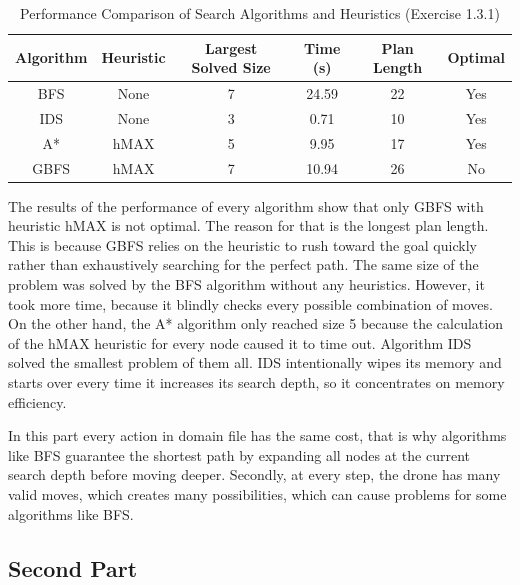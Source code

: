 \documentclass{article}
\begin{document}
\begin{table}[H]
\centering
\begin{tabular}{|c|c|c|c|c|c|}
\hline
\textbf{Algorithm} & \textbf{Heuristic} & \textbf{Largest Solved Size} & \textbf{Time (s)} & \textbf{Plan Length} & \textbf{Optimal} \\ \hline
BFS & None & 7 & 24.59 & 22 & Yes \\ \hline
IDS & None & 3 & 0.71 & 10 & Yes \\ \hline
A* & hMAX & 5 & 9.95 & 17 & Yes \\ \hline
GBFS & hMAX & 7 & 10.94 & 26 & No \\ \hline
\end{tabular}
\caption{Performance Comparison of Search Algorithms and Heuristics (Exercise 1.3.1)}
\label{tab:results_1_3_1}
\end{table}
The results of the performance of every algorithm show that only GBFS with heuristic hMAX is not optimal. The reason for that is the longest plan length. This is because GBFS relies on the heuristic to rush toward the goal quickly rather than exhaustively searching for the perfect path. The same size of the problem was solved by the BFS algorithm without any heuristics. However, it took more time, because it blindly checks every possible combination of moves. On the other hand, the A* algorithm only reached size 5 because the calculation of the hMAX heuristic for every node caused it to time out. Algorithm IDS solved the smallest problem of them all. IDS intentionally wipes its memory and starts over every time it increases its search depth, so it concentrates on memory efficiency.

In this part every action in domain file has the same cost, that is why algorithms like BFS guarantee the shortest path by expanding all nodes at the current search depth before moving deeper. Secondly, at every step, the drone has many valid moves, which creates many possibilities, which can cause problems for some algorithms like BFS.
\subsection{Second Part}
\end{document}
